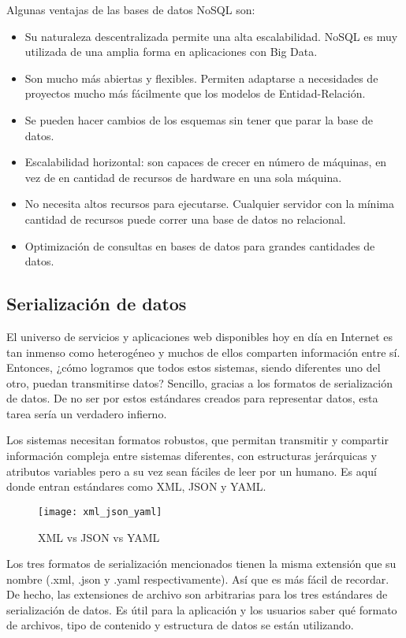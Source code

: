 Algunas ventajas de las bases de datos NoSQL son:

\begin{itemize}
  \item Su naturaleza descentralizada permite una alta escalabilidad. NoSQL es muy utilizada de una amplia forma en aplicaciones con Big Data.
  \item Son mucho más abiertas y flexibles. Permiten adaptarse a necesidades de proyectos mucho más fácilmente que los modelos de Entidad-Relación.
  \item Se pueden hacer cambios de los esquemas sin tener que parar la base de datos.
  \item Escalabilidad horizontal: son capaces de crecer en número de máquinas, en vez de en cantidad de recursos de hardware en una sola máquina.
  \item No necesita altos recursos para ejecutarse. Cualquier servidor con la mínima cantidad de recursos puede correr una base de datos no relacional.
  \item Optimización de consultas en bases de datos para grandes cantidades de datos.
\end{itemize}

\subsection{Serialización de datos}

El universo de servicios y aplicaciones web disponibles hoy en día en Internet es tan inmenso como heterogéneo y muchos de ellos comparten información entre sí. Entonces, ¿cómo logramos que todos estos sistemas, siendo diferentes uno del otro, puedan transmitirse datos? Sencillo, gracias a los formatos de serialización de datos. De no ser por estos estándares creados para representar datos, esta tarea sería un verdadero infierno.

Los sistemas necesitan formatos robustos, que permitan transmitir y compartir información compleja entre sistemas diferentes, con estructuras jerárquicas y atributos variables pero a su vez sean fáciles de leer por un humano. Es aquí donde entran estándares como XML, JSON y YAML.

\begin{figure}[htp!]
  \centering
  \texttt{[image: xml\_json\_yaml]}
  \caption{XML vs JSON vs YAML}
  \label{fig:xml_json_yaml}
\end{figure}

Los tres formatos de serialización mencionados tienen la misma extensión que su nombre (.xml, .json y .yaml respectivamente). Así que es más fácil de recordar. De hecho, las extensiones de archivo son arbitrarias para los tres estándares de serialización de datos. Es útil para la aplicación y los usuarios saber qué formato de archivos, tipo de contenido y estructura de datos se están utilizando.

